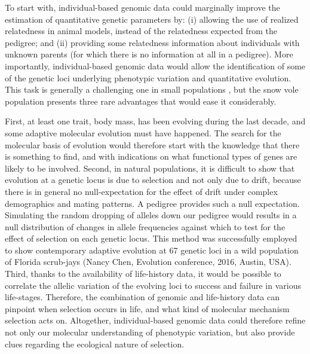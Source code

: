 To start with, individual-based genomic data could marginally improve the estimation of quantitative genetic parameters \parencite{Berenos2014} by: (i) allowing the use of realized relatedness in animal models, instead of the relatedness expected from the pedigree; and (ii) providing some relatedness information about individuals with unknown parents (for which there is no information at all in a pedigree). 
More importantly, individual-based genomic data would allow the identification of some of the genetic loci underlying phenotypic variation and quantitative evolution.
This task is generally a challenging one in small populations \parencite{Wellenreuther2016}, but the snow vole population presents three rare advantages that would ease it considerably. 

First, at least one trait, body mass, has been evolving during the last decade, and some adaptive molecular evolution must have happened. The search for the molecular basis of evolution would therefore start with the knowledge that there is something to find, and with indications on what functional types of genes are likely to be involved. 
Second, in natural populations, it is difficult to show that evolution at a genetic locus is due to selection and not only due to drift, because there is in general no null-expectation for the effect of drift under complex demographics and mating patterns. A pedigree provides such a null expectation. Simulating the random dropping of alleles down our pedigree would results in a null distribution of changes in allele frequencies against which to test for the effect of selection on each genetic locus. This method was successfully employed to show contemporary adaptive evolution at 67 genetic loci in a wild population of Florida scrub-jays (Nancy Chen, Evolution conference, 2016, Austin, USA).
Third, thanks to the availability of life-history data, it would be possible to correlate the allelic variation of the evolving loci to success and failure in various life-stages.  
Therefore, the combination of genomic and life-history data can pinpoint when selection occurs in life, and what kind of molecular mechanism selection acts on.
Altogether, individual-based genomic data could therefore refine not only our molecular understanding of phenotypic variation, but also provide clues regarding the ecological nature of selection. 


